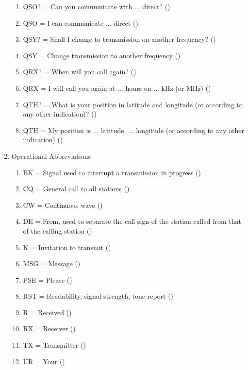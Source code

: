 \begin{flushleft}
\begin{enumerate}
\begin{enumerate}
\item QSO? = Can you communicate with ... direct?
  ()\label{HAREC.b.2.21}
\item QSO  = I can communicate ... direct
  ()\label{HAREC.b.2.22}
\item QSY? = Shall I change to transmission on another frequency?
  ()\label{HAREC.b.2.23}
\item QSY  = Change transmission to another frequency
  ()\label{HAREC.b.2.24}
\item QRX? = When will you call again?
  ()\label{HAREC.b.2.25}
\item QRX  = I will call you again at ... hours on ... kHz (or MHz)
  ()\label{HAREC.b.2.26}
\item QTH? = What is your position in latitude and longitude (or according to
  any other indication)? ()\label{HAREC.b.2.27}
\item QTH  = My position is  ... latitude, ... longitude (or according to any
  other indication) ()\label{HAREC.b.2.28}
\end{enumerate}

\item Operational Abbreviations
\begin{enumerate}
\item BK = Signal used to interrupt a transmission in progress
  ()\label{HAREC.b.3.1}
\item CQ = General call to all stations
  ()\label{HAREC.b.3.2}
\item CW = Continuous wave
  ()\label{HAREC.b.3.3}
\item DE = From, used to separate the call sign of the station called from that
  of the calling station ()\label{HAREC.b.3.4}
\item K = Invitation to transmit
  ()\label{HAREC.b.3.5}
\item MSG = Message
  ()\label{HAREC.b.3.6}
\item PSE = Please
  ()\label{HAREC.b.3.7}
\item RST = Readability, signal-strength, tone-report
  ()\label{HAREC.b.3.8}
\item R = Received
  ()\label{HAREC.b.3.9}
\item RX = Receiver
  ()\label{HAREC.b.3.10}
\item TX = Transmitter
  ()\label{HAREC.b.3.11}
\item UR = Your
  ()\label{HAREC.b.3.12}
\end{enumerate}


\end{enumerate}
\end{flushleft}
